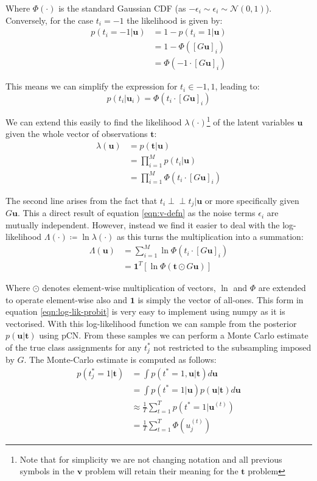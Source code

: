 \documentclass[]{article}
\newcommand{\Ncal}{\mathcal{N}}
\newcommand{\lik}{\lambda}
\newcommand{\loglik}{\Lambda}
\newcommand{\indep}{\perp \!\!\! \perp}
\newcommand{\tbold}{\boldsymbol{t}}
\newcommand{\ubold}{\boldsymbol{u}}
\newcommand{\vbold}{\boldsymbol{v}}
\begin{document}
Where $\Phi(\cdot)$ is the standard Gaussian CDF (as $-\epsilon_i \sim \epsilon_i \sim \Ncal(0,1)$). Conversely, for the case $t_i = -1$ the likelihood is given by:
%
\begin{align}
	p(t_i = -1 | \ubold) &= 1 - p(t_i = 1 | \ubold) \nonumber \\
	&= 1 - \Phi([G\ubold]_i) \nonumber \\
	&= \Phi(-1 \cdot [G\ubold]_i)
\end{align}

This means we can simplify the expression for $t_i \in {-1, 1}$, leading to:
%
\begin{equation}
	p(t_i | \ubold_i) = \Phi(t_i \cdot [G\ubold]_i)
\end{equation}

We can extend this easily to find the likelihood $\lik(\cdot)$\footnote{Note that for simplicity we are not changing notation and all previous symbols in the $\vbold$ problem will retain their meaning for the $\tbold$ problem} of the latent variables $\ubold$ given the whole vector of observations $\tbold$:
%
\begin{align}
	\lik(\ubold) &= p(\tbold | \ubold) \nonumber \\
	&= \prod_{i=1}^{M} p(t_i | \ubold) \nonumber \\
	&= \prod_{i=1}^{M} \Phi(t_i \cdot [G\ubold]_i)
\end{align}

The second line arises from the fact that $t_i \indep t_j | \ubold$ or more specifically given $G\ubold$. This a direct result of equation \ref{eqn:v-defn} as the noise terms $\epsilon_i$ are mutually independent. However, instead we find it easier to deal with the log-likelihood $\loglik(\cdot) \coloneqq \ln \lik(\cdot)$ as this turns the multiplication into a summation:
%
\begin{align}
	\loglik(\ubold) &= \sum_{i=1}^{M} \ln \Phi(t_i \cdot [G\ubold]_i) \nonumber \\
	&= \mathbf{1}^T \left[ \ln \Phi(\tbold \odot G\ubold) \right]
	\label{eqn:log-lik-probit}
\end{align}

Where $\odot$ denotes element-wise multiplication of vectors, $\ln$ and $\Phi$ are extended to operate element-wise also and $\mathbf{1}$ is simply the vector of all-ones. This form in equation \ref{eqn:log-lik-probit} is very easy to implement using numpy as it is vectorised. With this log-likelihood function we can sample from the posterior $p(\ubold | \tbold)$ using pCN. From these samples we can perform a Monte Carlo estimate of the true class assignments for any $t^*_j$ not restricted to the subsampling imposed by $G$. The Monte-Carlo estimate is computed as follows:
%
\begin{align}
	p(t^*_j = 1 | \tbold) &= \int p(t^* = 1, \ubold | \tbold) d\ubold \nonumber \\
	&= \int p(t^* = 1 | \ubold) p(\ubold | \tbold) d\ubold \nonumber \\
	&\approx \frac{1}{T} \sum_{t=1}^{T} p \left( t^* = 1 | \ubold^{(t)} \right) \nonumber \\
	&= \frac{1}{T} \sum_{t=1}^{T} \Phi \left( u^{(t)}_j \right)
\end{align}
\end{document}
